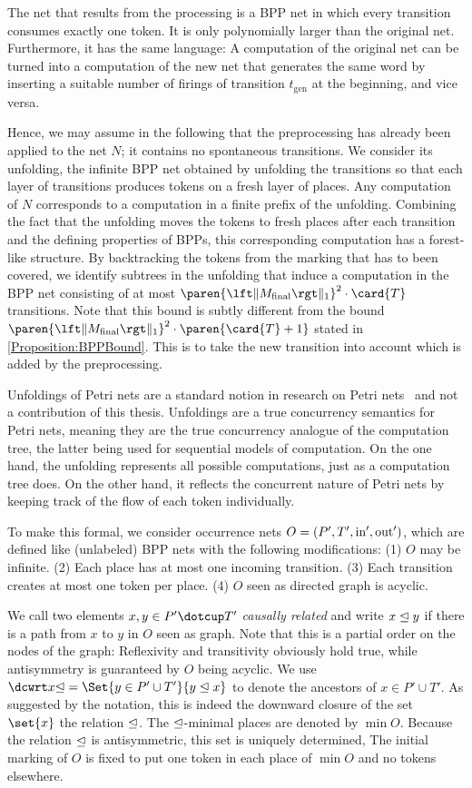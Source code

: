 \documentclass[../../diss.tex]{subfiles}
\begin{document}
The net that results from the processing is a BPP net in which every transition consumes exactly one token.
It is only polynomially larger than the original net.
Furthermore, it has the same language:
A computation of the original net can be turned into a computation of the new net that generates the same word by inserting a suitable number of firings of transition $t_{\text{gen}}$ at the beginning, and vice versa.

Hence, we may assume in the following that the preprocessing has already been applied to the net $N$; it contains no spontaneous transitions.
We consider its unfolding, the infinite BPP net obtained by unfolding the transitions so that each layer of transitions produces tokens on a fresh layer of places.
Any computation of $N$ corresponds to a computation in a finite prefix of the unfolding.
Combining the fact that the unfolding moves the tokens to fresh places after each transition and the defining properties of BPPs, this corresponding computation has a forest-like structure.
By backtracking the tokens from the marking that has to been covered, we identify subtrees in the unfolding that induce a computation in the BPP net consisting of at most $\paren{\normone{\Mfinal}}^2 \cdot \card{T}$ transitions.
Note that this bound is subtly different from the bound $\paren{\normone{\Mfinal}}^2 \cdot \paren{\card{T} +1}$ stated in \cref{Proposition:BPPBound}.
This is to take the new transition into account which is added by the preprocessing.

Unfoldings of Petri nets are a standard notion in research on Petri nets~\cite{EsparzaH08} and not a contribution of this thesis.
Unfoldings are a true concurrency semantics for Petri nets, meaning they are the true concurrency analogue of the computation tree, the latter being used for sequential models of computation.
On the one hand, the unfolding represents all possible computations, just as a computation tree does.
On the other hand, it reflects the concurrent nature of Petri nets by keeping track of the flow of each token individually.

To make this formal, we consider occurrence nets $O = (P', T', \text{in}',\text{out}')$, which are defined like (unlabeled) BPP nets with the following modifications:
(1) $O$ may be infinite.
(2) Each place has at most one incoming transition.
(3) Each transition creates at most one token per place.
(4) $O$ seen as directed graph is acyclic.

We call two elements $x,y \in P'\dotcup T'$ \emph{causally related} and write $x \trianglelefteq y$ if there is a path from $x$ to $y$ in $O$ seen as graph.
Note that this is a partial order on the nodes of the graph: Reflexivity and transitivity obviously hold true, while antisymmetry is guaranteed by $O$ being acyclic.
%
We use $\causalpredec{x}=\Set{y\in P'\cup T'}{y \causal x}$ to denote the ancestors of $x\in P'\cup T'$.
As suggested by the notation, this is indeed the downward closure of the set $\set{x}$ \wrt the relation $\trianglelefteq$.
The $\trianglelefteq$-minimal places are denoted by $\min O$.
Because the relation $\trianglelefteq$ is antisymmetric, this set is uniquely determined,
The initial marking of $O$ is fixed to put one token in each place of $\min O$ and no tokens elsewhere.
\end{document}
